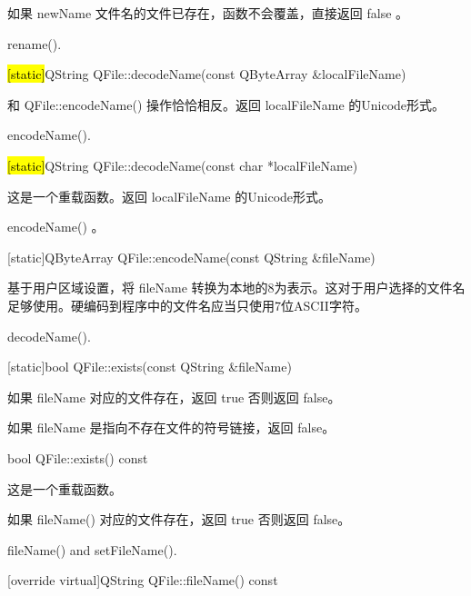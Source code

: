 \begin{notice}
如果 newName 文件名的文件已存在，函数不会覆盖，直接返回 false 。
\end{notice} 

\begin{notice}[另请参阅]
rename().
\end{notice} 

\hl{[static]}QString QFile::decodeName(const QByteArray \&localFileName)

和 QFile::encodeName() 操作恰恰相反。返回 localFileName 的Unicode形式。


\begin{notice}[另请参阅]
encodeName().
\end{notice} 

\hl{[static]}QString QFile::decodeName(const char *localFileName)

这是一个重载函数。返回 localFileName 的Unicode形式。


\begin{notice}[另请参阅]
 encodeName() 。
\end{notice} 


[static]QByteArray QFile::encodeName(const QString \&fileName)

基于用户区域设置，将 fileName 转换为本地的8为表示。这对于用户选择的文件名足够使用。硬编码到程序中的文件名应当只使用7位ASCII字符。


\begin{notice}[另请参阅]
decodeName().
\end{notice} 

[static]bool QFile::exists(const QString \&fileName)

如果 fileName 对应的文件存在，返回 true 否则返回 false。



\begin{notice}
如果 fileName 是指向不存在文件的符号链接，返回 false。
\end{notice} 

bool QFile::exists() const

这是一个重载函数。

如果 fileName() 对应的文件存在，返回 true 否则返回 false。



\begin{notice}[另请参阅]
fileName() and setFileName().
\end{notice} 

[override virtual]QString QFile::fileName() const

